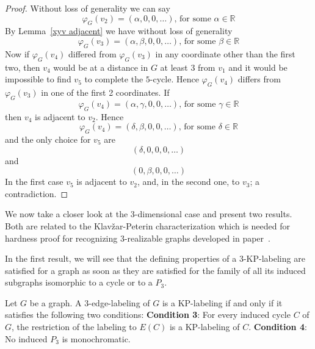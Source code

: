 \documentclass[12pt,a4paper,titlepage,openany]{report}
\begin{document}
\begin{proof}
Without loss of generality we can say
$$\varphi_G (v_2)=(\alpha,0,0,\ldots) \text{, for some } \alpha \in \mathbb{R} $$
By Lemma~\ref{xyv adjacent} we have without loss of generality
$$\varphi_G (v_3)=(\alpha,\beta,0,0,\ldots) \text{, for some } \beta \in \mathbb{R}$$
Now if $\varphi_G(v_4)$ differed from $\varphi_G(v_3)$ in any coordinate other than the first two, then $v_4$ would be at a distance in $G$ at least $3$ from $v_1$ and it would be impossible to find $v_5$ to complete the $5$-cycle. Hence $\varphi_G(v_4)$ differs from
$\varphi_G(v_3)$ in one of the first 2 coordinates. If
$$\varphi_G (v_4)=(\alpha,\gamma,0,0,\ldots) \text{, for some } \gamma \in \mathbb{R}$$
then $v_4$ is adjacent to $v_2$. Hence
$$\varphi_G (v_4)=(\delta,\beta,0,0,\ldots) \text{, for some } \delta \in \mathbb{R}$$
and the only choice for $v_5$ are
$$(\delta,0,0,0,\ldots)$$
and
$$(0,\beta,0,0,\ldots)$$
In the first case $v_5$ is adjacent to $v_2$, and, in the  second one, to $v_3$; a contradiction.
\end{proof}

We now take a closer look at the 3-dimensional case and present two results. Both are related to the Klav\v zar-Peterin characterization which is needed for hardness proof for recognizing 3-realizable graphs developed in paper~\cite{Milanic}.

In the first result, we will see that the defining properties of a 3-KP-labeling are satisfied for a graph as soon as they are satisfied for the family of all its induced subgraphs isomorphic to a cycle or to a $P_3$.

\begin{theorem}\label{3-edge-label}
Let $G$ be a graph. A 3-edge-labeling of $G$ is a KP-labeling if and only if it satisfies the following two conditions:\newline
\textbf{Condition 3}: For every induced cycle $C$ of $G$, the restriction of the labeling to $E(C)$ is
a KP-labeling of $C$.\newline
\textbf{Condition 4}: No induced $P_3$ is monochromatic.
\end{theorem}
\end{document}
